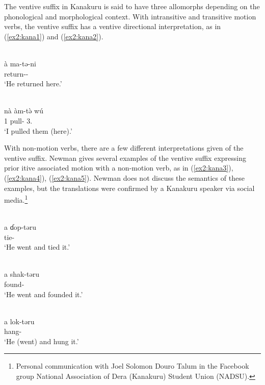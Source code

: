 The ventive suffix in Kanakuru is said to have three allomorphs depending on the phonological and morphological context. With intransitive and transitive motion verbs, the ventive suffix has a ventive directional interpretation, as in (\ref{ex2:kana1}) and (\ref{ex2:kana2}). 

\ea\label{ex2:kana1}
 \\
\gll à	ma-tə-ni \\
	return-- \\
\glt `He returned here.'

\ex\label{ex2:kana2}
 \\
\gll nà	àm-tə̀ wú \\
1	pull-	3. \\
\glt `I pulled them (here).'
\z 

With non-motion verbs, there are a few different interpretations given of the ventive suffix. Newman gives several examples of the ventive suffix expressing prior itive associated motion with a non-motion verb, as in (\ref{ex2:kana3}), (\ref{ex2:kana4}), (\ref{ex2:kana5}). Newman does not discuss the semantics of these examples, but the translations were confirmed by a Kanakuru speaker via social media.\footnote{Personal communication with Joel Solomon Douro Talum in the Facebook group National Association of Dera (Kanakuru) Student Union (NADSU).}

\ea\label{ex2:kana3}
 \\
\gll a	ɗop-təru \\
	tie- \\
\glt `He went and tied it.'

\ex\label{ex2:kana4}
 \\
\gll  a	shak-təru \\
	found- \\
\glt `He went and founded it.'

\ex\label{ex2:kana5}
 \\
\gll  a	lok-təru \\
	hang- \\
\glt `He (went) and hung it.'
\z 

